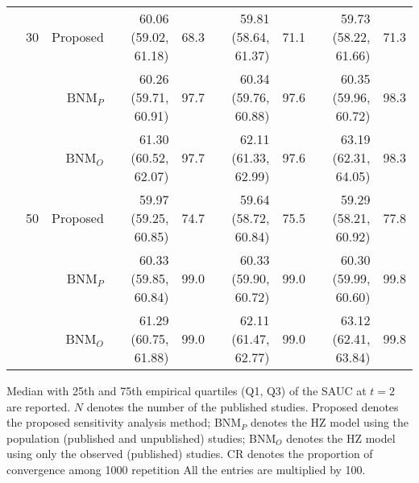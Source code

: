 \begin{table}[!htb]
\begin{threeparttable}
\begin{tabular}[t]{rrrrrrrrr}
\addlinespace
 & 30 & Proposed & 60.06 (59.02, 61.18) & 68.3 & 59.81 (58.64, 61.37) & 71.1 & 59.73 (58.22, 61.66) & 71.3\\
 &  & BNM$_P$ & 60.26 (59.71, 60.91) & 97.7 & 60.34 (59.76, 60.88) & 97.6 & 60.35 (59.96, 60.72) & 98.3\\
 &  & BNM$_O$ & 61.30 (60.52, 62.07) & 97.7 & 62.11 (61.33, 62.99) & 97.6 & 63.19 (62.31, 64.05) & 98.3\\
\addlinespace
 & 50 & Proposed & 59.97 (59.25, 60.85) & 74.7 & 59.64 (58.72, 60.84) & 75.5 & 59.29 (58.21, 60.92) & 77.8\\
 &  & BNM$_P$ & 60.33 (59.85, 60.84) & 99.0 & 60.33 (59.90, 60.72) & 99.0 & 60.30 (59.99, 60.60) & 99.8\\
 &  & BNM$_O$ & 61.29 (60.75, 61.88) & 99.0 & 62.11 (61.47, 62.77) & 99.0 & 63.12 (62.41, 63.84) & 99.8\\
\bottomrule
\end{tabular}
\begin{tablenotes}
\item 
			Median with 25th and 75th empirical quartiles (Q1, Q3) of the SAUC at $t=2$ are reported. 
			$N$ denotes the number of the published studies. 
			Proposed denotes the proposed sensitivity analysis method;
			BNM$_P$ denotes the HZ model using the population (published and unpublished) studies; 
			BNM$_O$ denotes the HZ model using only the observed (published) studies.
			CR denotes the proportion of convergence among 1000 repetition
			All the entries are multiplied by 100.
\end{tablenotes}
\end{threeparttable}
\end{table}

